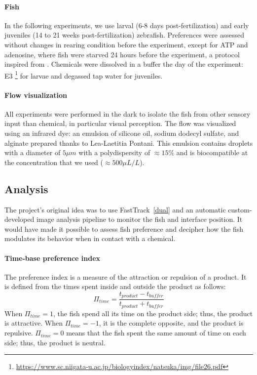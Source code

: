   \paragraph{Fish} In the following experiments, we use larval (6-8 days post-fertilization) and early juveniles (14 to 21 weeks post-fertilization) zebrafish. Preferences were assessed without changes in rearing condition before the experiment, except for ATP and adenosine, where fish were starved 24 hours before the experiment, a protocol inspired from \cite{wakisaka2017adenosine}. Chemicals were dissolved in a buffer the day of the experiment: E3 \footnote{\url{https://www.sc.niigata-u.ac.jp/biologyindex/natsuka/img/file26.pdf}} for larvae and degassed tap water for juveniles.

  \paragraph{Flow visualization} All experiments were performed in the dark to isolate the fish from other sensory input than chemical, in particular visual perception. The flow was visualized using an infrared dye: an emulsion of silicone oil, sodium dodecyl sulfate, and alginate prepared thanks to Lea-Laetitia Pontani. This emulsion contains droplets with a diameter of $5 \mu m$ with a polydispersity of $\approx 15 \%$ and is biocompatible \cite{ali2011large} at the concentration that we used ($\approx 500 \mu L/L$).

  \subsection{Analysis}
  The project's original idea was to use FastTrack~\ref{dual} and an automatic custom-developed image analysis pipeline to monitor the fish and interface position. It would have made it possible to assess fish preference and decipher how the fish modulates its behavior when in contact with a chemical.

  \paragraph{Time-base preference index} The preference index is a measure of the attraction or repulsion of a product. It is defined from the times spent inside and outside the product as follows:
  \begin{equation}
    \Pi_{time}=\frac{t_{product}-t_{buffer}}{t_{product}+t_{buffer}}
  \end{equation}
  \noindent When $\Pi_{time} = 1$, the fish spend all its time on the product side; thus, the product is attractive. When $\Pi_{time} = -1$, it is the complete opposite, and the product is repulsive. $\Pi_{time} = 0$ means that the fish spent the same amount of time on each side; thus, the product is neutral.

